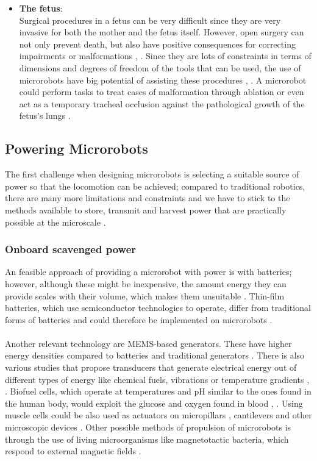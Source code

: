 \begin{itemize}
\item \textbf{The fetus}: \\ Surgical procedures in a fetus can be very difficult since they are very invasive for both the mother and the fetus itself. However, open surgery can not only prevent death, but also have positive consequences for correcting impairments or malformations \cite{Flake2003}, \cite{Durkin2009}. Since they are lots of constraints in terms of dimensions and degrees of freedom of the tools that can be used, the use of microrobots have big potential of assisting these procedures \cite{Flake2003}, \cite{Berris2006}. A microrobot could perform tasks to treat cases of malformation through ablation or even act as a temporary tracheal occlusion against the pathological growth of the fetus's lungs \cite{Nelson2010}.
\end{itemize}

\subsection{Powering Microrobots}
The first challenge when designing microrobots is selecting a suitable source of power so that the locomotion can be achieved; compared to traditional robotics, there are many more limitations and constraints and we have to stick to the methods available to store, transmit and harvest power that are practically possible at the microscale \cite{Nelson2010}.

\subsubsection{Onboard scavenged power}
An feasible approach of providing a microrobot with power is with batteries; however, although these might be inexpensive, the amount energy they can provide scales with their volume, which makes them unsuitable \cite{Nelson2010}. Thin-film batteries, which use semiconductor technologies to operate, differ from traditional forms of batteries and could therefore be implemented on microrobots \cite{Nelson2010}. \\\\
Another relevant technology are MEMS-based generators. These have higher energy densities compared to batteries and traditional generators \cite{Jacobson2003}. There is also various studies that propose transducers that generate electrical energy out of different types of energy like chemical fuels, vibrations or temperature gradients \cite{DiSalvo1999}, \cite{kasap2006}. Biofuel cells, which operate at temperatures and pH similar to the ones found in the human body, would exploit the glucose and oxygen found in blood \cite{Bullen2006}, \cite{Barton2004}. Using muscle cells could be also used as actuators on micropillars \cite{Morishima2006}, cantilevers \cite{Kim2008} and other microscopic devices \cite{Xi2005}. Other possible methods of propulsion of microrobots is through the use of living microorganisms like magnetotactic bacteria, which respond to external magnetic fields \cite{Martel2009}. 

